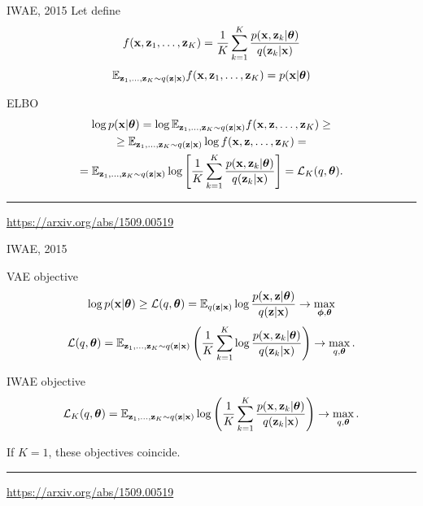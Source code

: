 \begin{frame}{IWAE, 2015}
	Let define
	\[
	f(\mathbf{x}, \mathbf{z}_1, \dots, \mathbf{z}_K) = \frac{1}{K} \sum_{k=1}^K \frac{p(\mathbf{x}, \mathbf{z}_k | \boldsymbol{\theta})}{q(\mathbf{z}_k | \mathbf{x})}
	\]
	\[
		\mathbb{E}_{\mathbf{z}_1, \dots, \mathbf{z}_K \sim q(\mathbf{z} | \mathbf{x})} f(\mathbf{x}, \mathbf{z}_1, \dots, \mathbf{z}_K) = p(\mathbf{x} | \boldsymbol{\theta})
	\]
	\vspace{-0.3cm}
	\begin{block}{ELBO}
		\vspace{-0.5cm}
		\begin{multline*}
			\log p(\mathbf{x} | \boldsymbol{\theta}) = \log \mathbb{E}_{\mathbf{z}_1, \dots, \mathbf{z}_K \sim q(\mathbf{z} | \mathbf{x})} f(\mathbf{x}, \mathbf{z}, \dots, \mathbf{z}_K) \geq \\
			\geq \mathbb{E}_{\mathbf{z}_1, \dots, \mathbf{z}_K \sim q(\mathbf{z} | \mathbf{x})} \log f(\mathbf{x}, \mathbf{z}, \dots, \mathbf{z}_K) = \\
			= \mathbb{E}_{\mathbf{z}_1, \dots, \mathbf{z}_K \sim q(\mathbf{z} | \mathbf{x})} \log \left[\frac{1}{K} \sum_{k=1}^K\frac{p(\mathbf{x}, \mathbf{z}_k | \boldsymbol{\theta})}{q(\mathbf{z}_k | \mathbf{x})} \right] = \mathcal{L}_K(q, \boldsymbol{\theta}).
		\end{multline*}
	\end{block}
	\vfill
	\hrule\medskip
	{\scriptsize \href{https://arxiv.org/abs/1509.00519}{https://arxiv.org/abs/1509.00519}}
\end{frame}
\begin{frame}{IWAE, 2015}
\begin{block}{VAE objective}
	\vspace{-0.2cm}
	\[
	\log p(\mathbf{x} | \boldsymbol{\theta}) \geq \mathcal{L} (q, \boldsymbol{\theta})  = \mathbb{E}_{q(\mathbf{z} | \mathbf{x})} \log \frac{p(\mathbf{x}, \mathbf{z} | \boldsymbol{\theta})}{q(\mathbf{z}| \mathbf{x})} \rightarrow \max_{\boldsymbol{\phi}, \boldsymbol{\theta}}
	\]
	\[
	\mathcal{L} (q, \boldsymbol{\theta})  = \mathbb{E}_{\mathbf{z}_1, \dots, \mathbf{z}_K \sim q(\mathbf{z} | \mathbf{x})} \left( \frac{1}{K} \sum_{k=1}^K \log \frac{p(\mathbf{x}, \mathbf{z}_k | \boldsymbol{\theta})}{q(\mathbf{z}_k| \mathbf{x})} \right) \rightarrow \max_{q, \boldsymbol{\theta}}.
	\]
	\vspace{-0.2cm}
\end{block}
\begin{block}{IWAE objective}
	\vspace{-0.2cm}
	\[
	\mathcal{L}_K (q, \boldsymbol{\theta})  = \mathbb{E}_{\mathbf{z}_1, \dots, \mathbf{z}_K \sim q(\mathbf{z} | \mathbf{x})} \log \left( \frac{1}{K}\sum_{k=1}^K\frac{p(\mathbf{x}, \mathbf{z}_k | \boldsymbol{\theta})}{q(\mathbf{z}_k| \mathbf{x})} \right) \rightarrow \max_{q, \boldsymbol{\theta}}.
	\]
\end{block}
If $K=1$, these objectives coincide.

\vfill
\hrule\medskip
{\scriptsize \href{https://arxiv.org/abs/1509.00519}{https://arxiv.org/abs/1509.00519}}
\end{frame}
